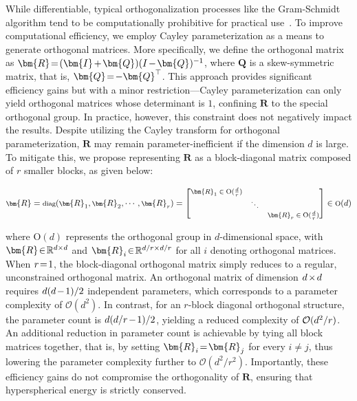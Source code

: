 While differentiable, typical orthogonalization processes like the Gram-Schmidt algorithm tend to be computationally prohibitive for practical use~\cite{liu2021orthogonal}. To improve computational efficiency, we employ Cayley parameterization as a means to generate orthogonal matrices. More specifically, we define the orthogonal matrix as $\thickmuskip=2mu \medmuskip=2mu \bm{R}=(\bm{I}+\bm{Q})(I-\bm{Q})^{-1}$, where $\bm{Q}$ is a skew-symmetric matrix, that is, $\thickmuskip=2mu \medmuskip=2mu \bm{Q}=-\bm{Q}^\top$. This approach provides significant efficiency gains but with a minor restriction—Cayley parameterization can only yield orthogonal matrices whose determinant is $1$, confining $\bm{R}$ to the special orthogonal group. In practice, however, this constraint does not negatively impact the results. Despite utilizing the Cayley transform for orthogonal parameterization, $\bm{R}$ may remain parameter-inefficient if the dimension $d$ is large. To mitigate this, we propose representing $\bm{R}$ as a block-diagonal matrix composed of $r$ smaller blocks, as given below:

\begin{equation}
    \footnotesize
    \bm{R}=\text{diag}(\bm{R}_1,\bm{R}_2,\cdots,\bm{R}_r)=\begin{bmatrix}
    \bm{R}_1\in \text{O}(\frac{d}{r}) &  &\\
    &\ddots & \\
    & & \bm{R}_r\in \text{O}(\frac{d}{r})
    \end{bmatrix}\in \text{O}(d)
\end{equation}

where $\text{O}(d)$ represents the orthogonal group in $d$-dimensional space, with $\thickmuskip=2mu \medmuskip=2mu \bm{R}\in\mathbb{R}^{d\times d}$ and $\thickmuskip=2mu \medmuskip=2mu \bm{R}_i\in\mathbb{R}^{d/r\times d/r}$ for all $i$ denoting orthogonal matrices. When $\thickmuskip=2mu \medmuskip=2mu r=1$, the block-diagonal orthogonal matrix simply reduces to a regular, unconstrained orthogonal matrix. An orthogonal matrix of dimension $\thickmuskip=2mu \medmuskip=2mu d\times d$ requires $\thickmuskip=2mu \medmuskip=2mu d(d-1)/2$ independent parameters, which corresponds to a parameter complexity of $\mathcal{O}(d^2)$. In contrast, for an $r$-block diagonal orthogonal structure, the parameter count is $\thickmuskip=2mu \medmuskip=2mu d(d/r-1)/2$, yielding a reduced complexity of $\thickmuskip=2mu \medmuskip=2mu \mathcal{O}(d^2/r)$. An additional reduction in parameter count is achievable by tying all block matrices together, that is, by setting $\thickmuskip=2mu \medmuskip=2mu\bm{R}_i=\bm{R}_j$ for every $i\neq j$, thus lowering the parameter complexity further to $\mathcal{O}(d^2/r^2)$. Importantly, these efficiency gains do not compromise the orthogonality of $\bm{R}$, ensuring that hyperspherical energy is strictly conserved.

